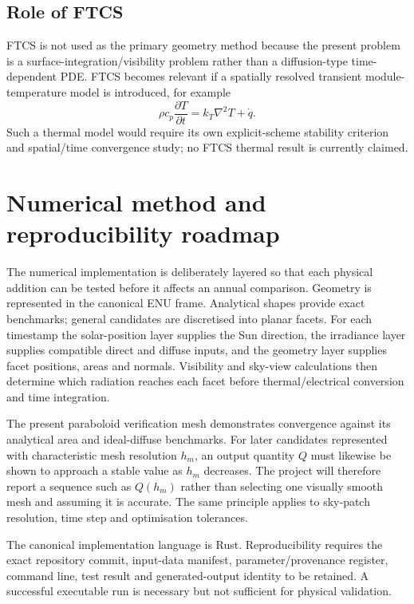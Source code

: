 \documentclass[11pt,a4paper]{article}
\begin{document}
\subsection{Role of FTCS}
FTCS is not used as the primary geometry method because the present problem is a surface-integration/visibility problem rather than a diffusion-type time-dependent PDE. FTCS becomes relevant if a spatially resolved transient module-temperature model is introduced, for example
\begin{equation}
\rho c_p\frac{\partial T}{\partial t}
=
k_T\nabla^2T+\dot q.
\end{equation}
Such a thermal model would require its own explicit-scheme stability criterion and spatial/time convergence study; no FTCS thermal result is currently claimed.

\section{Numerical method and reproducibility roadmap}
The numerical implementation is deliberately layered so that each physical addition can be tested before it affects an annual comparison. Geometry is represented in the canonical ENU frame. Analytical shapes provide exact benchmarks; general candidates are discretised into planar facets. For each timestamp the solar-position layer supplies the Sun direction, the irradiance layer supplies compatible direct and diffuse inputs, and the geometry layer supplies facet positions, areas and normals. Visibility and sky-view calculations then determine which radiation reaches each facet before thermal/electrical conversion and time integration.

The present paraboloid verification mesh demonstrates convergence against its analytical area and ideal-diffuse benchmarks. For later candidates represented with characteristic mesh resolution $h_m$, an output quantity $Q$ must likewise be shown to approach a stable value as $h_m$ decreases. The project will therefore report a sequence such as $Q(h_m)$ rather than selecting one visually smooth mesh and assuming it is accurate. The same principle applies to sky-patch resolution, time step and optimisation tolerances.

The canonical implementation language is Rust. Reproducibility requires the exact repository commit, input-data manifest, parameter/provenance register, command line, test result and generated-output identity to be retained. A successful executable run is necessary but not sufficient for physical validation.
\end{document}
